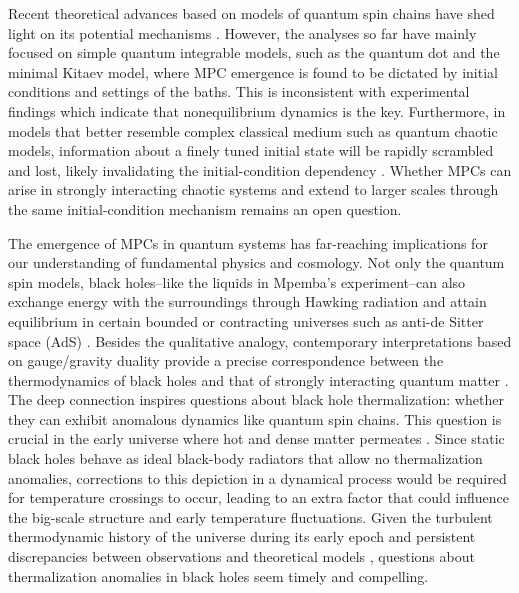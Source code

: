 \documentclass[prl,superscriptaddress,notitlepage,showpacs,twocolumn]{revtex4-2}
\begin{document}
Recent theoretical advances based on models of quantum spin chains have shed light on its potential mechanisms  \cite{wang2024mpemba,Moroder24,rylands2024microscopic,chatterjee2023quantum,carollo2021exponentially,murciano2024entanglement,yamashika2024entanglement,liu2024symmetry,chatterjee2024multiple,nava2024mpemba}. However, the analyses so far have mainly focused on simple quantum integrable models, such as the quantum dot and the minimal Kitaev model, where MPC emergence is found to be dictated by initial conditions and settings of the baths. This is inconsistent with experimental findings which indicate that nonequilibrium dynamics is the key. Furthermore, in models that better resemble complex classical medium such as quantum chaotic models, information about a finely tuned initial state will be rapidly scrambled and lost, likely invalidating the initial-condition dependency \cite{maldacena2016bound,touil2021information,ares2025quantum,liu2024symmetry,turkeshi2024quantum,qian2024intrinsic}. %
Whether MPCs can arise in strongly interacting chaotic systems and extend to larger scales through the same initial-condition mechanism remains an open question.

The emergence of MPCs in quantum systems has far-reaching implications for our understanding of fundamental physics and cosmology. Not only the quantum spin models, black holes--like the liquids in Mpemba's experiment--can also exchange energy with the surroundings through Hawking radiation and attain equilibrium in certain bounded or contracting universes such as anti-de Sitter space (AdS) \cite{hawking1975particle}. Besides the qualitative analogy, contemporary interpretations based on gauge/gravity duality provide a precise correspondence between the thermodynamics of black holes and that of strongly interacting quantum matter \cite{maldacena1999large}. The deep connection inspires questions about black hole thermalization: whether they can exhibit anomalous dynamics like quantum spin chains. This question is crucial in the early universe where hot and dense matter permeates \cite{dodelson2020modern,gorbunov2011introduction}. Since static black holes behave as ideal black-body radiators that allow no thermalization anomalies, corrections to this depiction in a dynamical process would be required for temperature crossings to occur, leading to an extra factor that could influence the big-scale structure and early temperature fluctuations. Given the turbulent thermodynamic history of the universe during its early epoch and persistent discrepancies between observations and theoretical models \cite{aghanim2020planck,di2021realm,riess2022comprehensive,bertone2018history}, questions about thermalization anomalies in black holes seem timely and compelling. 
\end{document}
